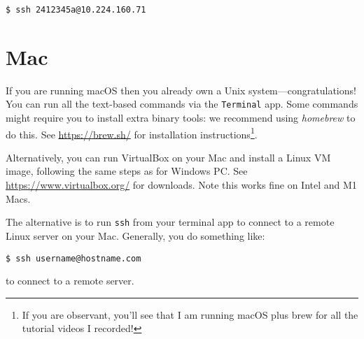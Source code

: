 \documentclass{article}
\begin{document}
\begin{lstlisting}[style=BashInputStyle]
  $ ssh 2412345a@10.224.160.71
\end{lstlisting}





\section*{Mac}

If you are running macOS then you already own a Unix system---congratulations!
You can run all the text-based commands via the \texttt{Terminal}
app. Some commands might require you to install extra binary tools:
we recommend using \textit{homebrew} to do this. See \url{https://brew.sh/} for installation instructions\footnote{If
you are observant, you'll see that I am running macOS plus brew for all
the tutorial videos I recorded!}.

Alternatively, you can run VirtualBox on your Mac and install a
Linux VM image, following the same steps as for Windows PC.
See \url{https://www.virtualbox.org/} for downloads. Note this works fine
on Intel and M1 Macs.

The alternative is to run \texttt{ssh} from your terminal app
to connect to a remote Linux server on your Mac. Generally, you
do something like:

\begin{lstlisting}[style=BashInputStyle]
  $ ssh username@hostname.com
\end{lstlisting}

to connect to a remote server.
\end{document}
